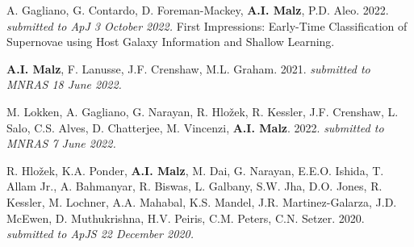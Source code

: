 \begin{list}{\pubnumber{\therefpubnum}}{\malzlist}



\item A. Gagliano, G. Contardo, D. Foreman-Mackey, {\bf A.I. Malz}, P.D. Aleo. 2022. {\em submitted to ApJ 3 October 2022.} First Impressions: Early-Time Classification of Supernovae using Host Galaxy Information and Shallow Learning.
  
\item {\bf A.I. Malz}, F. Lanusse, J.F. Crenshaw, M.L. Graham. 2021. {\em submitted to MNRAS 18 June 2022.} 
  
\item  M. Lokken, A. Gagliano, G. Narayan, R. Hlo{\v z}ek, R. Kessler, J.F. Crenshaw, L. Salo, C.S. Alves, D. Chatterjee, M. Vincenzi, {\bf A.I. Malz}. 2022. {\em submitted to MNRAS 7 June 2022.} 
	
\item R. Hlo{\v z}ek, K.A. Ponder, {\bf A.I. Malz}, M. Dai, G. Narayan, E.E.O. Ishida,%
 T. Allam Jr., A. Bahmanyar, R. Biswas, L. Galbany, S.W. Jha, D.O. Jones, R. Kessler, M. Lochner, A.A. Mahabal, K.S. Mandel, J.R. Martinez-Galarza, J.D. McEwen, D. Muthukrishna, H.V. Peiris, C.M. Peters, C.N. Setzer. 2020. {\em submitted to ApJS 22 December 2020.} 


\end{list}
